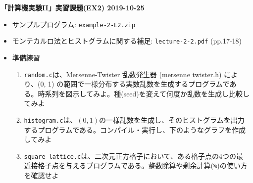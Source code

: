 \documentclass[11pt]{jarticle}
\begin{document}
\noindent
{\bf\large 「計算機実験II」実習課題(EX2) 2019-10-25}
\\[-0.5em]

\noindent
\begin{itemize}
\item サンプルプログラム: {\tt example-2-L2.zip}

\item モンテカルロ法とヒストグラムに関する補足: {\tt lecture-2-2.pdf} (pp.17-18)

\item 準備練習
  
\begin{enumerate}
\item {\tt random.c}は、Mersenne-Twister 乱数発生器 (mersenne twister.h) により、(0, 1) の範囲で一様分布する実数乱数を生成するプログラムである。時系列を図示してみよ。種(seed)を変えて何度か乱数を生成し比較してみよ
\item {\tt histogram.c}は、$(0,1)$の一様乱数を生成し、そのヒストグラムを出力するプログラムである。コンパイル・実行し、下のようなグラフを作成してみよ
  \vspace*{-2em}
  \begin{center}
  \end{center}
\item {\tt square\_lattice.c}は、二次元正方格子において、ある格子点の4つの最近接格子点を与えるプログラムである。整数除算や剰余計算({\tt \%})の使い方を確認せよ
\end{enumerate}


\end{itemize}
\end{document}
